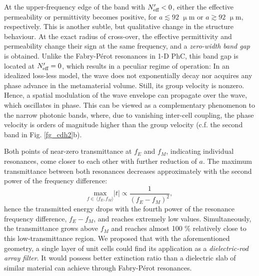 At the upper-frequency edge of the band with $N_{\text{eff} }'<0$, either the effective permeability or permittivity becomes positive, for $a\lesssim 92$ $\upmu$m or  $a\gtrsim 92$ $\upmu$m, respectively. This is another subtle, but qualitative change in the structure behaviour. 
At the exact radius of cross-over, the effective permittivity and permeability change their sign at the same frequency, and a \textit{zero-width band gap} is obtained. Unlike the Fabry-Pérot resonances in 1-D PhC, this band gap is located at $N_{\text{eff} }'=0$, which results in a peculiar regime of operation: In an idealized loss-less model, the wave does not exponentially decay nor acquires any phase advance in the metamaterial volume. Still, its group velocity is nonzero. Hence, a spatial modulation of the wave envelope can propagate over the wave, which oscillates in phase. This can be viewed as a complementary phenomenon to the narrow photonic bands, where, due to vanishing inter-cell coupling, the phase velocity is orders of magnitude higher than the group velocity (c.f. the second band in Fig. \ref{fg_cdh2}b).

Both points of near-zero transmittance at $f_E$ and $f_M$, indicating individual resonances, come closer to each other with further reduction of $a$. The maximum transmittance between both resonances decreases approximately with the second power of the frequency difference:
\begin{equation} \underset{f \in\,\langle f_E,f_M\rangle}{\text{max}} |t| \propto \frac{1}{(f_E-f_M)^{2}}, \label{eq_fEfM}\end{equation}
hence the transmitted energy drops with the fourth power of the resonance frequency difference, $f_E-f_M$, and reaches extremely low values. Simultaneously, the transmittance grows above $f_M$ and reaches almost 100 \% relatively close to this low-transmittance region. 
We proposed \cite{dominec2014transition} that with the aforementioned geometry, a single layer of unit cells could find its application as a \textit{dielectric-rod array filter}. It would possess better extinction ratio than a dielectric slab of similar material can achieve through Fabry-Pérot resonances.

